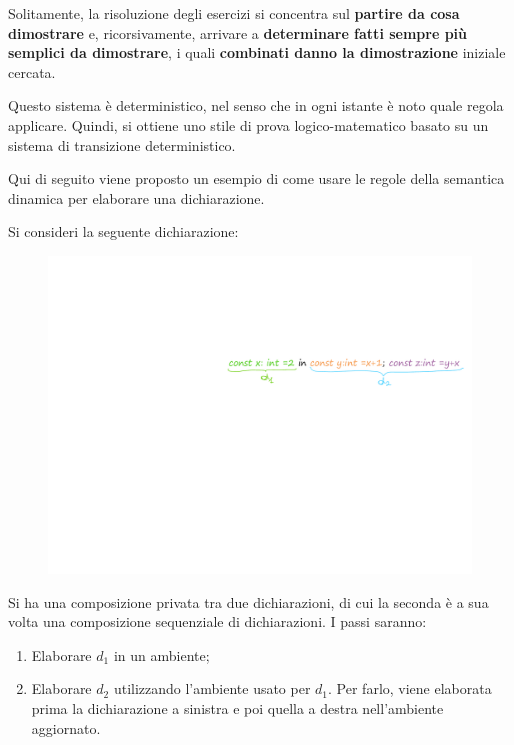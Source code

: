 \documentclass[a4paper]{article}
\begin{document}
	Solitamente, la risoluzione degli esercizi si concentra sul \textbf{partire da cosa dimostrare} e, ricorsivamente, arrivare a \textbf{determinare fatti sempre più semplici da dimostrare}, i quali \textbf{combinati danno la dimostrazione} iniziale cercata.\newline
	
	\noindent
	Questo sistema è deterministico, nel senso che in ogni istante è noto quale regola applicare. Quindi, si ottiene uno stile di prova logico-matematico basato su un sistema di transizione deterministico.\newline
	
	\noindent
	Qui di seguito viene proposto un esempio di come usare le regole della semantica dinamica per elaborare una dichiarazione.\newline
	
	\noindent
	Si consideri la seguente dichiarazione:
	\begin{figure}[!htp]
		\centering
		\includegraphics[width=.8\textwidth]{img/regola_dichiarazione-ex1.pdf}
	\end{figure}
	
	\noindent
	Si ha una composizione privata tra due dichiarazioni, di cui la seconda è a sua volta una composizione sequenziale di dichiarazioni. I passi saranno:
	\begin{enumerate}
		\item Elaborare $d_{1}$ in un ambiente;
		\item Elaborare $d_{2}$ utilizzando l'ambiente usato per $d_{1}$. Per farlo, viene elaborata prima la dichiarazione a sinistra e poi quella a destra nell'ambiente aggiornato.
	\end{enumerate}
	
\end{document}
